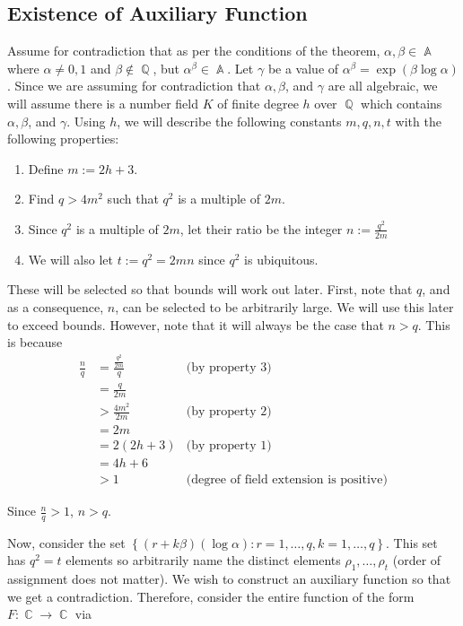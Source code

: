 \documentclass[a4paper, 11pt]{book}
\DeclareMathOperator{\A}{\mathbb{A}}
\DeclareMathOperator{\C}{\mathbb{C}}
\DeclareMathOperator{\Q}{\mathbb{Q}}
\begin{document}
{    \subsection{Existence of Auxiliary Function} Assume for contradiction that as per the conditions of the theorem, $\alpha, \beta \in \A$ where $\alpha \neq 0, 1$ and $\beta \notin \Q$, but $\alpha^{\beta} \in \A$. Let $\gamma$ be a value of ${\alpha}^{\beta} = \exp(\beta \log \alpha)$. Since we are assuming for contradiction that $\alpha, \beta$, and $\gamma$ are all algebraic, we will assume there is a number field $K$ of finite degree $h$ over $\Q$ which contains $\alpha, \beta$, and $\gamma$. Using $h$, we will describe the following constants $m,q,n,t$ with the following properties:

    \begin{enumerate}
        \item{Define $m := 2h+3$.}
        \item{Find $q > 4m^2$ such that $q^2$ is a multiple of $2m$.}
        \item{Since $q^2$ is a multiple of $2m$, let their ratio be the integer $n := \frac{q^2}{2m}$}
        \item{We will also let $t := q^2 = 2mn$ since $q^2$ is ubiquitous.}
    \end{enumerate}

    These will be selected so that bounds will work out later. First, note that $q$, and as a consequence, $n$, can be selected to be arbitrarily large. We will use this later to exceed bounds. However, note that it will always be the case that $n > q$. This is because 
    \begin{align*}
        \frac{n}{q} &= \frac{\frac{q^2}{2m}}{q} & \text{(by property 3)}\\
                    &= \frac{q}{2m} \\
                    &> \frac{4m^2}{2m} &\text{(by property 2)}\\
                    &= 2m \\
                    &= 2(2h+3) &\text{(by property 1)}\\
                    &= 4h+6 \\
                    &> 1 &\text{(degree of field extension is positive)} 
    \end{align*}

    Since $\frac{n}{q} > 1$, $n > q$.\par 
    Now, consider the set $\left\{(r + k\beta)(\log \alpha) : r = 1, \ldots, q, k = 1, \ldots, q\right\}$. This set has $q^2 = t$ elements so arbitrarily name the distinct elements $\rho_1, \ldots, \rho_t$ (order of assignment does not matter). We wish to construct an auxiliary function so that we get a contradiction. Therefore, consider the entire function of the form $F: \C \to \C$ via 

}
\end{document}
